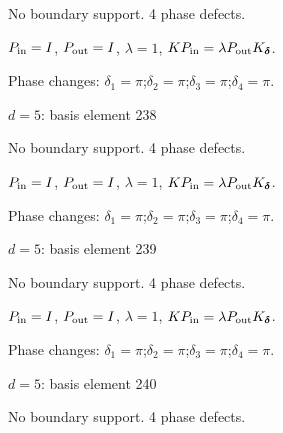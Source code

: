 No boundary support. 4 phase defects.
\begin{center}
\end{center}
\vspace{-1mm}
$P_{\rm in}=I$, \quad $P_{\rm out}=I$, \quad $\lambda=1$, \qquad $K P_{\rm in}=\lambda P_{\rm out}K_{\boldsymbol\delta}$.
\par\smallskip\begin{minipage}{.98\linewidth}\small Phase changes: $\delta_{1}=\pi$;\quad $\delta_{2}=\pi$;\quad $\delta_{3}=\pi$;\quad $\delta_{4}=\pi$.\end{minipage}
\vfill
{\footnotesize\texttt{}}
\newpage
{}
{\Large $d=5$: basis element 238}\par
No boundary support. 4 phase defects.
\begin{center}
\end{center}
\vspace{-1mm}
$P_{\rm in}=I$, \quad $P_{\rm out}=I$, \quad $\lambda=1$, \qquad $K P_{\rm in}=\lambda P_{\rm out}K_{\boldsymbol\delta}$.
\par\smallskip\begin{minipage}{.98\linewidth}\small Phase changes: $\delta_{1}=\pi$;\quad $\delta_{2}=\pi$;\quad $\delta_{3}=\pi$;\quad $\delta_{4}=\pi$.\end{minipage}
\vfill
{\footnotesize\texttt{}}
\newpage
{}
{\Large $d=5$: basis element 239}\par
No boundary support. 4 phase defects.
\begin{center}
\end{center}
\vspace{-1mm}
$P_{\rm in}=I$, \quad $P_{\rm out}=I$, \quad $\lambda=1$, \qquad $K P_{\rm in}=\lambda P_{\rm out}K_{\boldsymbol\delta}$.
\par\smallskip\begin{minipage}{.98\linewidth}\small Phase changes: $\delta_{1}=\pi$;\quad $\delta_{2}=\pi$;\quad $\delta_{3}=\pi$;\quad $\delta_{4}=\pi$.\end{minipage}
\vfill
{\footnotesize\texttt{}}
\newpage
{}
{\Large $d=5$: basis element 240}\par
No boundary support. 4 phase defects.
